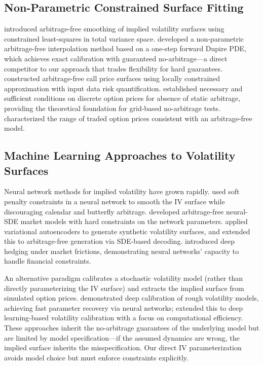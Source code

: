 \documentclass[11pt,a4paper]{article}
\begin{document}
\subsection{Non-Parametric Constrained Surface Fitting}

\citet{fengler2009} introduced arbitrage-free smoothing of implied volatility surfaces using constrained least-squares in total variance space. \citet{andreasen2011} developed a non-parametric arbitrage-free interpolation method based on a one-step forward Dupire PDE, which achieves exact calibration with guaranteed no-arbitrage---a direct competitor to our approach that trades flexibility for hard guarantees. \citet{glaser2012} constructed arbitrage-free call price surfaces using locally constrained approximation with input data risk quantification. \citet{cousot2007} established necessary and sufficient conditions on discrete option prices for absence of static arbitrage, providing the theoretical foundation for grid-based no-arbitrage tests. \citet{davis2007} characterized the range of traded option prices consistent with an arbitrage-free model.

\subsection{Machine Learning Approaches to Volatility Surfaces}

Neural network methods for implied volatility have grown rapidly. \citet{ackerer2020} used soft penalty constraints in a neural network to smooth the IV surface while discouraging calendar and butterfly arbitrage. \citet{cohen2023} developed arbitrage-free neural-SDE market models with hard constraints on the network parameters. \citet{bergeron2022} applied variational autoencoders to generate synthetic volatility surfaces, and \citet{ning2023} extended this to arbitrage-free generation via SDE-based decoding. \citet{buehler2019} introduced deep hedging under market frictions, demonstrating neural networks' capacity to handle financial constraints.

An alternative paradigm calibrates a stochastic volatility model (rather than directly parameterizing the IV surface) and extracts the implied surface from simulated option prices. \citet{bayer2019} demonstrated deep calibration of rough volatility models, achieving fast parameter recovery via neural networks; \citet{horvath2021} extended this to deep learning-based volatility calibration with a focus on computational efficiency. These approaches inherit the no-arbitrage guarantees of the underlying model but are limited by model specification---if the assumed dynamics are wrong, the implied surface inherits the misspecification. Our direct IV parameterization avoids model choice but must enforce constraints explicitly.
\end{document}
